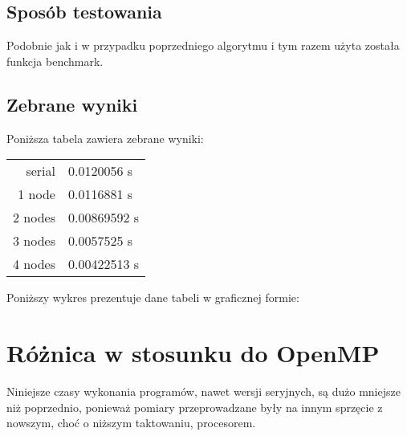 \documentclass[12pt]{article}
\begin{document}
		\subsection{Sposób testowania}
Podobnie jak i w przypadku poprzedniego algorytmu i tym razem użyta została funkcja benchmark.
		\subsection{Zebrane wyniki}	
				Poniższa tabela zawiera zebrane wyniki: \newline
		\begin{tabular}{|r|l|} \hline
			serial	&	0.0120056 s \\
			1 node	&	0.0116881 s \\
			2 nodes	&	0.00869592 s \\
			3 nodes	&	0.0057525 s \\
			4 nodes	&	0.00422513 s \\
			\hline
		\end{tabular}\newline 
		
		Poniższy wykres prezentuje dane tabeli w graficznej formie:	\newline
		\begin{bchart}[step=0.003, max=0.015, unit=s]
		\end{bchart}	


	\section{Różnica w stosunku do OpenMP}
	Niniejsze czasy wykonania programów, nawet wersji seryjnych, są dużo mniejsze niż poprzednio, ponieważ pomiary przeprowadzane były na innym sprzęcie z nowszym, choć o niższym taktowaniu, procesorem.
	
\end{document}
